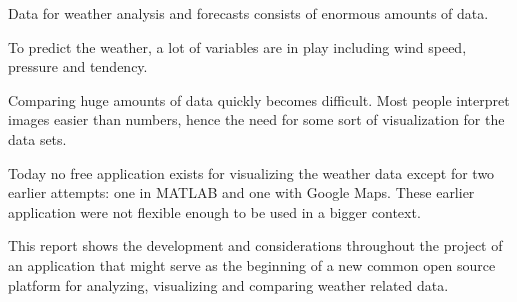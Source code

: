 Data for weather analysis and forecasts consists of enormous amounts of data.

To predict the weather, a lot of variables are in play including wind speed, pressure and tendency.

Comparing huge amounts of data quickly becomes difficult. Most people interpret images easier than numbers, hence the need for some sort of visualization for the data sets.

Today no free application exists for visualizing the weather data except for two earlier attempts: one in MATLAB and one with Google Maps. These earlier application were not flexible enough to be used in a bigger context.

This report shows the development and considerations throughout the project of an application that might serve as the beginning of a new common open source platform for analyzing, visualizing and comparing weather related data.
